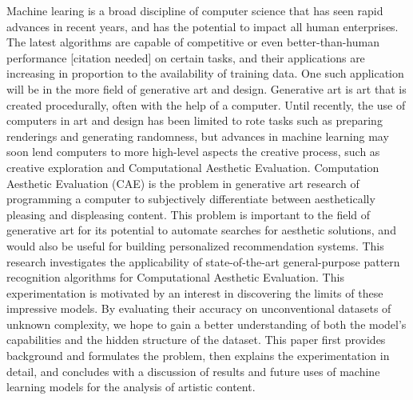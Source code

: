 \documentclass[midd]{thesis}
\begin{document}
Machine learing is a broad discipline of computer science that has seen rapid advances in recent years, and has the potential to impact all human enterprises. The latest algorithms are capable of competitive or even better-than-human performance [citation needed] on certain tasks, and their applications are increasing in proportion to the availability of training data. One such application will be in the more  field of generative art and design. Generative art is art that is created procedurally, often with the help of a computer. Until recently, the use of computers in art and design has been limited to rote tasks such as preparing renderings and generating randomness, but advances in machine learning may soon lend computers to more high-level aspects the creative process, such as creative exploration and Computational Aesthetic Evaluation. Computation Aesthetic Evaluation (CAE) is the problem in generative art research of programming a computer to subjectively differentiate between aesthetically pleasing and displeasing content. This problem is important to the field of generative art for its potential to automate searches for aesthetic solutions, and would also be useful for building personalized recommendation systems. This research investigates the applicability of state-of-the-art general-purpose pattern recognition algorithms for Computational Aesthetic Evaluation. This experimentation is motivated by an interest in discovering the limits of these impressive models. By evaluating their accuracy on unconventional datasets of unknown complexity, we hope to gain a better understanding of both the model's capabilities and the hidden structure of the dataset. This paper first provides background and formulates the problem, then explains the experimentation in detail, and concludes with a discussion of results and future uses of machine learning models for the analysis of artistic content.

\end{document}
